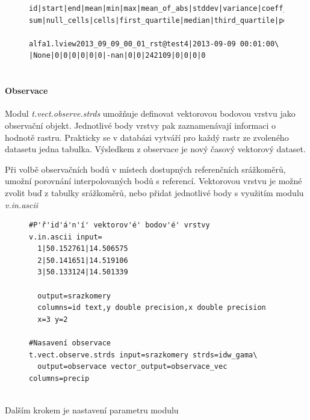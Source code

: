 \documentclass[a4paper,12pt,oneside]{report}
\begin{document}
\begin{figure}[h!]
\begin{footnotesize}
\lstset{extendedchars=false,
escapeinside=''}
\begin{lstlisting}[style=mybash]
id|start|end|mean|min|max|mean_of_abs|stddev|variance|coeff_var|\
sum|null_cells|cells|first_quartile|median|third_quartile|percentil

alfa1.lview2013_09_09_00_01_rst@test4|2013-09-09 00:01:00\
|None|0|0|0|0|0|0|-nan|0|0|242109|0|0|0|0
    
\end{lstlisting}
\end{footnotesize} 
\end{figure}


\paragraph{Observace}
Modul \textit{t.vect.observe.strds} umožňuje definovat vektorovou bodovou vrstvu jako observační objekt. Jednotlivé body vrstvy pak zaznamenávají informaci o hodnotě rastru. Prakticky se v databázi vytváří pro každý rastr ze zvoleného datasetu jedna tabulka. Výsledkem z observace je nový časový vektorový dataset.

Při volbě observačních bodů v místech dostupných referenčních srážkoměrů, umožní porovnání interpolovaných bodů s referencí. Vektorovou vrstvu je možné zvolit buď z tabulky srážkoměrů, nebo přidat jednotlivé body s využitím modulu \textit{v.in.ascii}
\begin{figure}[h!]
\begin{footnotesize}
\lstset{extendedchars=false,
escapeinside=''}
\begin{lstlisting}[style=mybash]
#P'ř'id'á'n'í' vektorov'é' bodov'é' vrstvy
v.in.ascii input=
  1|50.152761|14.506575
  2|50.141651|14.519106
  3|50.133124|14.501339
  
  output=srazkomery 
  columns=id text,y double precision,x double precision 
  x=3 y=2
  
#Nasavení observace  
t.vect.observe.strds input=srazkomery strds=idw_gama\
  output=observace vector_output=observace_vec columns=precip
  
\end{lstlisting}
\end{footnotesize} 
\end{figure}

Dalším krokem je nastavení parametru modulu
\begin{figure}[h!]
\begin{footnotesize}
\lstset{extendedchars=false,
escapeinside=''}
\begin{lstlisting}[style=mybash]

\end{lstlisting}
\end{footnotesize} 
\end{figure}
\end{document}
